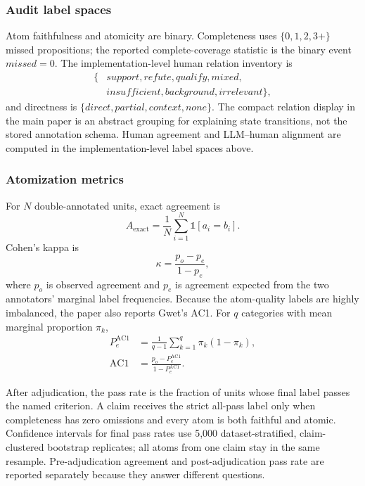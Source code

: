 
\subsubsection{Audit label spaces}

Atom faithfulness and atomicity are binary.  Completeness uses
\(\{0,1,2,3+\}\) missed propositions; the reported complete-coverage
statistic is the binary event \(\textit{missed}=0\).
The implementation-level human relation inventory is
\[
\begin{aligned}
\{&\textit{support},\textit{refute},\textit{qualify},\textit{mixed},\\
&\textit{insufficient},\textit{background},\textit{irrelevant}\},
\end{aligned}
\]
and directness is
\(\{\textit{direct},\textit{partial},\textit{context},\textit{none}\}\).
The compact relation display in the main paper is an abstract grouping for
explaining state transitions, not the stored annotation schema.  Human
agreement and LLM--human alignment are computed in the implementation-level
label spaces above.

\subsubsection{Atomization metrics}

For \(N\) double-annotated units, exact agreement is
\[
A_{\mathrm{exact}}=\frac{1}{N}\sum_{i=1}^{N}
\mathbb{1}[a_i=b_i].
\]
Cohen's kappa is
\[
\kappa=\frac{p_o-p_e}{1-p_e},
\]
where \(p_o\) is observed agreement and \(p_e\) is agreement expected from
the two annotators' marginal label frequencies.  Because the atom-quality
labels are highly imbalanced, the paper also reports Gwet's AC1.  For \(q\)
categories with mean marginal proportion \(\pi_k\),
\[
\begin{aligned}
P_e^{\mathrm{AC1}}
&=\frac{1}{q-1}\sum_{k=1}^{q}\pi_k(1-\pi_k),\\
\mathrm{AC1}
&=\frac{p_o-P_e^{\mathrm{AC1}}}
{1-P_e^{\mathrm{AC1}}}.
\end{aligned}
\]

After adjudication, the pass rate is the fraction of units whose final
label passes the named criterion.  A claim receives the strict all-pass
label only when completeness has zero omissions and every atom is both
faithful and atomic.  Confidence intervals for final pass rates use 5,000
dataset-stratified, claim-clustered bootstrap replicates; all atoms from one
claim stay in the same resample.  Pre-adjudication agreement and
post-adjudication pass rate are reported separately because they answer
different questions.


